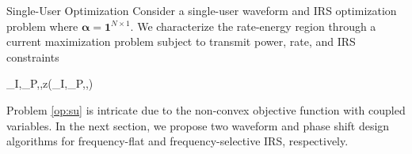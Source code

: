 \documentclass{IEEEtran}
\begin{document}
\begin{section}{Single-User Optimization}
	Consider a single-user waveform and IRS optimization problem where $\boldsymbol{\alpha}=\boldsymbol{1}^{N \times 1}$. We characterize the rate-energy region through a current maximization problem subject to transmit power, rate, and IRS constraints
	\begin{maxi!}
			{\boldsymbol{w}_I,_P,\boldsymbol{\phi},\rho}{z(\boldsymbol{w}_I,_P,\boldsymbol{\phi},\rho)}{\label{op:su}}{}
		\end{maxi!}
	Problem \ref{op:su} is intricate due to the non-convex objective function with coupled variables. In the next section, we propose two waveform and phase shift design algorithms for frequency-flat and frequency-selective IRS, respectively.


\end{section}
\end{document}
